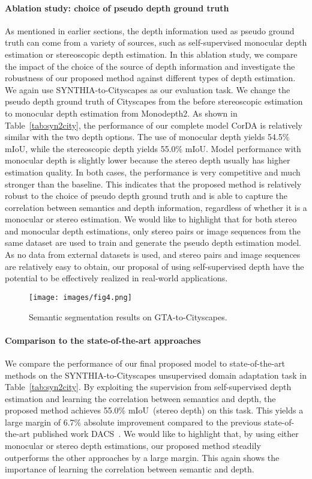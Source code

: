 \documentclass[10pt,twocolumn,letterpaper]{article}
\begin{document}
\paragraph{Ablation study: choice of pseudo depth ground truth}
As mentioned in earlier sections, the depth information used as pseudo ground truth  can come from a variety of sources, such as self-supervised monocular depth estimation or stereoscopic depth estimation. In this ablation study, we compare the impact of the choice of the source of depth information and  investigate the robustness of our proposed method against different types of depth estimation. We again use SYNTHIA-to-Cityscapes as our evaluation task. We change the pseudo depth ground truth of Cityscapes from the before stereoscopic estimation to monocular depth estimation from Monodepth2. As shown in Table~\ref{tab:syn2city}, the performance of our complete model CorDA is relatively similar with the two depth options. The use of monocular depth yields 54.5\% mIoU, while the stereoscopic depth yields 55.0\% mIoU. Model performance with monocular depth  is slightly lower because the stereo depth usually has  higher estimation quality. In both cases, the performance is very competitive and much stronger than the baseline. This indicates that the proposed method is relatively robust to the choice of pseudo depth ground truth and is able to capture the correlation between semantics and depth information, regardless of whether it is a monocular or stereo estimation. We would like to highlight that for both stereo and monocular depth estimations, only stereo pairs or image sequences from the same dataset are used to train and generate the pseudo depth estimation model. As no data from external datasets is used, and stereo pairs and image sequences are relatively easy to obtain, our proposal of using self-supervised depth have the potential to be effectively realized in real-world applications.


\begin{figure}[t!]
	\centering
	\texttt{[image: images/fig4.png]}
	\caption{Semantic segmentation results on GTA-to-Cityscapes.}
	\label{quali}
	\vspace{-5mm}
\end{figure}
\paragraph{Comparison to the state-of-the-art approaches}
We compare the performance of our final proposed model to state-of-the-art methods on the SYNTHIA-to-Cityscapes unsupervised domain adaptation task in Table~\ref{tab:syn2city}. By exploiting the supervision from self-supervised depth estimation and learning the correlation between semantics and depth, the proposed method achieves 55.0\% mIoU~(stereo depth) on this task. This yields a large margin of 6.7\% absolute improvement compared to the previous state-of-the-art published work DACS~\cite{tranheden2020dacs}. We would like to highlight that, by using either monocular or stereo depth estimations, our proposed method steadily outperforms the other approaches by a large margin. This again shows the importance of learning the correlation between semantic and depth.
\end{document}
